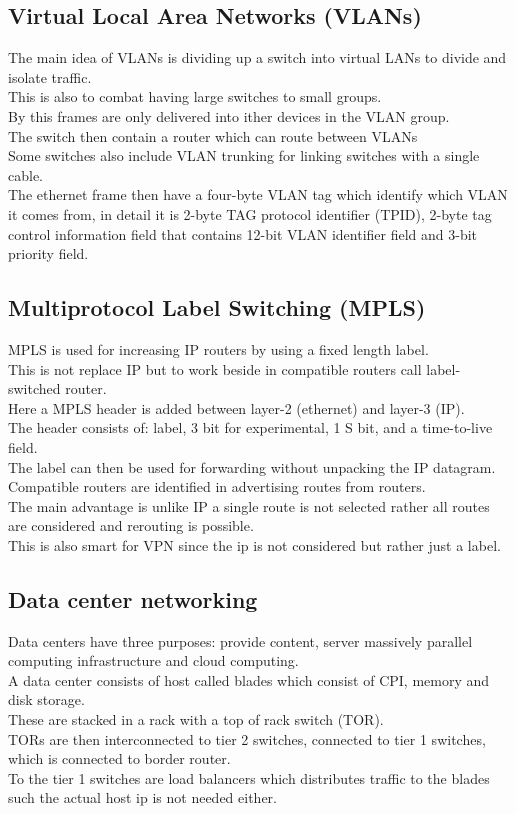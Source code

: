 \documentclass[12pt, a4paper]{article}
\begin{document}
		\subsection{Virtual Local Area Networks (VLANs)}
			The main idea of VLANs is dividing up a switch into virtual LANs to divide and isolate traffic.\\
			This is also to combat having large switches to small groups.\\
			By this frames are only delivered into ither devices in the VLAN group.\\
			The switch then contain a router which can route between VLANs\\
			Some switches also include VLAN trunking for linking switches with a single cable.\\
			The ethernet frame then have a four-byte VLAN tag which identify which VLAN it comes from, in detail it is 2-byte TAG protocol identifier (TPID), 2-byte tag control information field that contains 12-bit VLAN identifier field and 3-bit priority field.\\
		\subsection{Multiprotocol Label Switching (MPLS)}
			MPLS is used for increasing IP routers by using a fixed length label.\\
			This is not replace IP but to work beside in compatible routers call label-switched router.\\
			Here a MPLS header is added between layer-2 (ethernet) and layer-3 (IP).\\
			The header consists of: label, 3 bit for experimental, 1 S bit, and a time-to-live field.\\
			The label can then be used for forwarding without unpacking the IP datagram.\\
			Compatible routers are identified in advertising routes from routers.\\
			The main advantage is unlike IP a single route is not selected rather all routes are considered and rerouting is possible.\\
			This is also smart for VPN since the ip is not considered but rather just a label.
		\subsection{Data center networking}
			Data centers have three purposes: provide content, server massively parallel computing infrastructure and cloud computing.\\
			A data center consists of host called blades which consist of CPI, memory and disk storage.\\
			These are stacked in a rack with a top of rack switch (TOR). \\
			TORs are then interconnected to tier 2 switches, connected to tier 1 switches, which is connected to border router.\\
			To the tier 1 switches are load balancers which distributes traffic to the blades such the actual host ip is not needed either.
\end{document}
